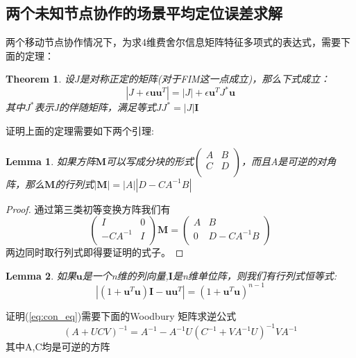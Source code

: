 \documentclass[notheorems,xetex,mathserif,serif]{beamer}
\newtheorem{theorem}{Theorem}
\newtheorem{lemma}{Lemma}
\begin{document}
\subsection{两个未知节点协作的场景平均定位误差求解}
\begin{frame}
两个移动节点协作情况下，为求4维费舍尔信息矩阵特征多项式的表达式，需要下面的定理：
\begin{theorem}\label{thm:ShenIden}
设$J$是对称正定的矩阵(对于FIM这一点成立)，那么下式成立：
\begin{equation}\label{eq:ShenIden}
|J+\epsilon \bm{u}\bm{u}^T|=|J|+\epsilon \bm{u}^TJ^*\bm{u}
\end{equation}
其中$J^*$表示J的伴随矩阵，满足等式$JJ^*=|J|\bm{I}$
\end{theorem}
证明上面的定理需要如下两个引理:
\begin{lemma}\label{lemma:block}
如果方阵$\bm{M}$可以写成分块的形式$\left(\begin{array}{cc}
A&B\\
C&D\\
\end{array}\right)$，而且A是可逆的对角阵，那么$\bm{M}$的行列式$|\bm{M}|=|A||D-CA^{-1}B|$
\end{lemma}
\end{frame}
\begin{frame}
\begin{proof}
通过第三类初等变换方阵我们有\[
\left(\begin{array}{cc}
I&0\\
-CA^{-1}&I\\
\end{array}\right) \bm{M}=\left(\begin{array}{cc}
A&B\\
0&D-CA^{-1}B\\
\end{array}\right)\]
两边同时取行列式即得要证明的式子。
\end{proof}
\begin{lemma}
如果$\bm{u}$是一个n维的列向量,$\bm{I}$是n维单位阵，则我们有行列式恒等式:
\begin{equation}\label{eq:con_eq}
|(1+\bm{u}^T\bm{u})\bm{I}-\bm{u}\bm{u}^T|=(1+\bm{u}^T\bm{u})^{n-1}
\end{equation}
\end{lemma}
证明(\ref{eq:con_eq})需要下面的Woodbury 矩阵求逆公式
\begin{equation}
(A+UCV)^{-1}=A^{-1}-A^{-1}U(C^{-1}+VA^{-1}U)^{-1}VA^{-1}
\end{equation}
其中A,C均是可逆的方阵
\end{frame}
\end{document}
